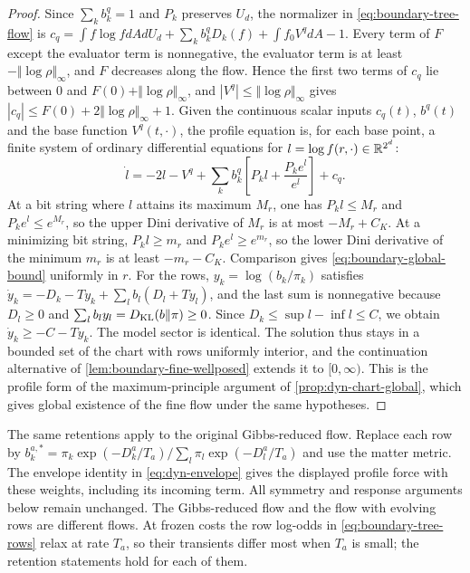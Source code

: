 \begin{proof}
Since $\sum_kb_k^q=1$ and $P_k$ preserves $U_d$, the normalizer in \cref{eq:boundary-tree-flow} is $c_q=\int f\log f dA dU_d+\sum_kb_k^qD_k(f)+\int f_0V^q dA-1$. Every term of $F$ except the evaluator term is nonnegative, the evaluator term is at least $-\Vert\log\rho\Vert_\infty$, and $F$ decreases along the flow. Hence the first two terms of $c_q$ lie between $0$ and $F(0)+\Vert\log\rho\Vert_\infty$, and $|V^q|\le\Vert\log\rho\Vert_\infty$ gives $|c_q|\le F(0)+2\Vert\log\rho\Vert_\infty+1$. Given the continuous scalar inputs $c_q(t)$, $b^q(t)$ and the base function $V^q(t,\cdot)$, the profile equation is, for each base point, a finite system of ordinary differential equations for $l=\log f(r,\cdot)\in\mathbb R^{2^d}$:
\begin{equation*}
 \dot l=-2l-V^q+\sum_kb_k^q\left[P_kl+\frac{P_ke^l}{e^l}\right]+c_q.
\end{equation*}
At a bit string where $l$ attains its maximum $M_r$, one has $P_kl\le M_r$ and $P_ke^l\le e^{M_r}$, so the upper Dini derivative of $M_r$ is at most $-M_r+C_K$. At a minimizing bit string, $P_kl\ge m_r$ and $P_ke^l\ge e^{m_r}$, so the lower Dini derivative of the minimum $m_r$ is at least $-m_r-C_K$. Comparison gives \cref{eq:boundary-global-bound} uniformly in $r$. For the rows, $y_k=\log(b_k/\pi_k)$ satisfies $\dot y_k=-D_k-T y_k+\sum_lb_l(D_l+Ty_l)$, and the last sum is nonnegative because $D_l\ge0$ and $\sum_lb_ly_l=D_{\mathrm{KL}}(b\Vert\pi)\ge0$. Since $D_k\le\sup l-\inf l\le C$, we obtain $\dot y_k\ge-C-Ty_k$. The model sector is identical. The solution thus stays in a bounded set of the chart with rows uniformly interior, and the continuation alternative of \cref{lem:boundary-fine-wellposed} extends it to $[0,\infty)$. This is the profile form of the maximum-principle argument of \cref{prop:dyn-chart-global}, which gives global existence of the fine flow under the same hypotheses.
\end{proof}

The same retentions apply to the original Gibbs-reduced flow. Replace each row by $b_k^{a,*}=\pi_k\exp(-D_k^a/T_a)/\sum_l\pi_l\exp(-D_l^a/T_a)$ and use the matter metric. The envelope identity in \cref{eq:dyn-envelope} gives the displayed profile force with these weights, including its incoming term. All symmetry and response arguments below remain unchanged. The Gibbs-reduced flow and the flow with evolving rows are different flows. At frozen costs the row log-odds in \cref{eq:boundary-tree-rows} relax at rate $T_a$, so their transients differ most when $T_a$ is small; the retention statements hold for each of them.

